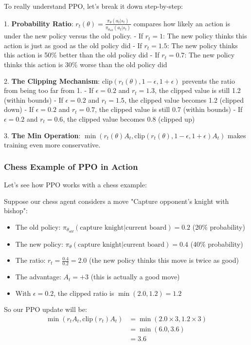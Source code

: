 \documentclass[11pt]{article}
\begin{document}
To really understand PPO, let's break it down step-by-step:

1. \textbf{Probability Ratio}: $r_t(\theta) = \frac{\pi_\theta(a_t|s_t)}{\pi_{\theta_{old}}(a_t|s_t)}$ compares how likely an action is under the new policy versus the old policy.
   - If $r_t = 1$: The new policy thinks this action is just as good as the old policy did
   - If $r_t = 1.5$: The new policy thinks this action is 50\% better than the old policy did
   - If $r_t = 0.7$: The new policy thinks this action is 30\% worse than the old policy did

2. \textbf{The Clipping Mechanism}: $\text{clip}(r_t(\theta), 1-\epsilon, 1+\epsilon)$ prevents the ratio from being too far from 1.
   - If $\epsilon = 0.2$ and $r_t = 1.3$, the clipped value is still 1.2 (within bounds)
   - If $\epsilon = 0.2$ and $r_t = 1.5$, the clipped value becomes 1.2 (clipped down)
   - If $\epsilon = 0.2$ and $r_t = 0.7$, the clipped value is still 0.7 (within bounds)
   - If $\epsilon = 0.2$ and $r_t = 0.6$, the clipped value becomes 0.8 (clipped up)

3. \textbf{The Min Operation}: $\min(r_t(\theta) A_t, \text{clip}(r_t(\theta), 1-\epsilon, 1+\epsilon) A_t)$ makes training even more conservative.

\subsubsection*{Chess Example of PPO in Action}

Let's see how PPO works with a chess example:

Suppose our chess agent considers a move "Capture opponent's knight with bishop":

\begin{itemize}
    \item The old policy: $\pi_{\theta_{old}}(\text{capture knight}|\text{current board}) = 0.2$ (20\% probability)
    \item The new policy: $\pi_{\theta}(\text{capture knight}|\text{current board}) = 0.4$ (40\% probability)
    \item The ratio: $r_t = \frac{0.4}{0.2} = 2.0$ (the new policy thinks this move is twice as good)
    \item The advantage: $A_t = +3$ (this is actually a good move)
    \item With $\epsilon = 0.2$, the clipped ratio is $\min(2.0, 1.2) = 1.2$
\end{itemize}

So our PPO update will be:
\begin{align*}
    \min(r_t A_t, \text{clip}(r_t) A_t) &= \min(2.0 \times 3, 1.2 \times 3) \\
    &= \min(6.0, 3.6) \\
    &= 3.6
\end{align*}
\end{document}
